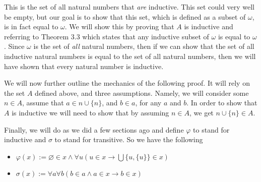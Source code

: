 \documentclass[12pt, a4paper]{article}
\begin{document}
\vspace{4mm}

\noindent This is the set of all natural numbers that \textit{are} inductive. This set could very well be empty, but our goal is to show that this set, which is defined as a subset of $\omega$, is in fact equal to $\omega$. We will show this by proving that $A$ is inductive and referring to Theorem 3.3 which states that any inductive subset of $\omega$ is equal to $\omega$. Since $\omega$ is the set of \textit{all} natural numbers, then if we can show that the set of all inductive natural numbers is equal to the set of all natural numbers, then we will have shown that every natural number is inductive.\par

 We will now further outline the mechanics of the following proof. It will rely on the set $A$ defined above, and three assumptions. Namely, we will consider some $n\in A$, assume that $a\in n\cup\{n\}$, and $b\in a$, for any $a$ and $b$. In order to show that $A$ is inductive we will need to show that by assuming $n\in A$, we get $n\cup\{n\}\in A$.\par

Finally, we will do as we did a few sections ago and define $\varphi$ to stand for inductive and $\sigma$ to stand for transitive. So we have the following\par

\begin{itemize}

\item $\varphi(x):=\varnothing\in x\wedge \forall u(u\in x\rightarrow \bigcup\{u,\{u\}\}\in x)$

\item $\sigma(x) := \forall a\forall b(b\in a\wedge a\in x\rightarrow b\in x)$

\end{itemize}

\newpage

\end{document}
